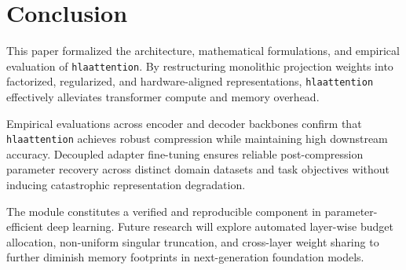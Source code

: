 \section{Conclusion}
This paper formalized the architecture, mathematical formulations, and empirical evaluation of \texttt{hlaattention}. By restructuring monolithic projection weights into factorized, regularized, and hardware-aligned representations, \texttt{hlaattention} effectively alleviates transformer compute and memory overhead.

Empirical evaluations across encoder and decoder backbones confirm that \texttt{hlaattention} achieves robust compression while maintaining high downstream accuracy. Decoupled adapter fine-tuning ensures reliable post-compression parameter recovery across distinct domain datasets and task objectives without inducing catastrophic representation degradation.

The module constitutes a verified and reproducible component in parameter-efficient deep learning. Future research will explore automated layer-wise budget allocation, non-uniform singular truncation, and cross-layer weight sharing to further diminish memory footprints in next-generation foundation models.
